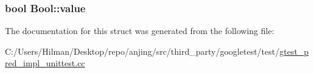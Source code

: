 \subsubsection[{value}]{\setlength{\rightskip}{0pt plus 5cm}bool Bool\+::value}\label{struct_bool_a16be863c269f988cdcbe59f9d846a141}


The documentation for this struct was generated from the following file\+:\begin{DoxyCompactItemize}
\item 
C\+:/\+Users/\+Hilman/\+Desktop/repo/anjing/src/third\+\_\+party/googletest/test/\hyperlink{gtest__pred__impl__unittest_8cc}{gtest\+\_\+pred\+\_\+impl\+\_\+unittest.\+cc}\end{DoxyCompactItemize}
